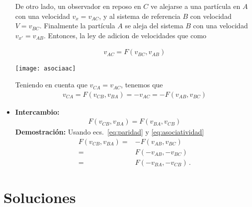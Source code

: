 \begin{frame}
\begin{itemize}
De otro lado, un observador en reposo en $C$ ve alejarse a una 
partícula en $A$ con una velocidad $v_x=v_{AC}$, y al sistema de
referencia $B$ con velocidad $V=v_{BC}$. Finalmente la partícula $A$
se aleja del sistema $B$ con una velocidad $v_{x'}=v_{AB}$. Entonces,
la ley de adicion de velocidades que como

\begin{minipage}{0.4\linewidth}
\begin{align*}
      v_{AC}=F(v_{BC},v_{AB})
\end{align*}  
\end{minipage}
\begin{minipage}{0.6\linewidth}
  \texttt{[image: asociaac]}
\end{minipage}

Teniendo en cuenta que $v_{CA}=v_{AC}$, tenemos que
  \begin{align}
    \label{eq:asociatividad}
    v_{CA}=F(v_{CB},v_{BA})=-v_{AC}=-F(v_{AB},v_{BC})
  \end{align}
\item \textbf{Intercambio:}
  \begin{align}
    \label{eq:intercambio}
    F(v_{CB},v_{BA})=F(v_{BA},v_{CB})
  \end{align}
\textbf{Demostración:} Usando ecs.~\eqref{eq:paridad} y \eqref{eq:asociatividad}
\begin{align*}
  F(v_{CB},v_{BA})=&-F(v_{AB},v_{BC})\nonumber\\
=& F(-v_{AB},-v_{BC})\nonumber\\
=& F(-v_{BA},-v_{CB})\,.
\end{align*}
\end{itemize}
\end{frame}
\section{Soluciones}

